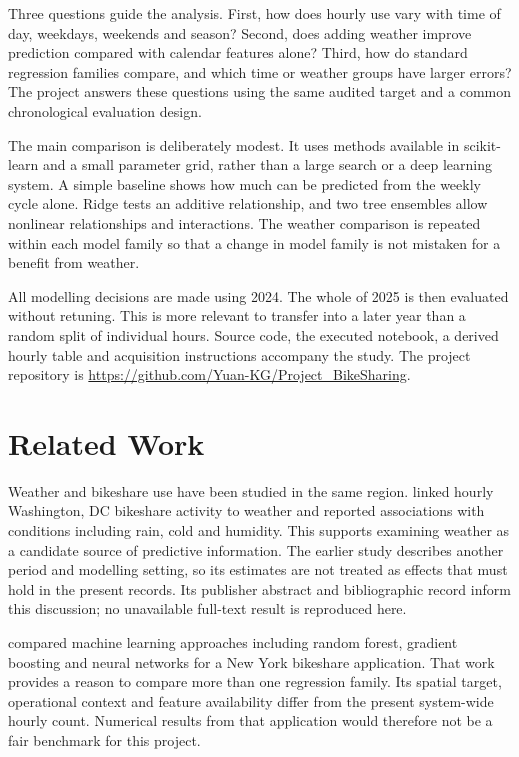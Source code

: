 \documentclass[10pt]{article}
\begin{document}
Three questions guide the analysis. First, how does hourly use vary with time of day, weekdays, weekends and season? Second, does adding weather improve prediction compared with calendar features alone? Third, how do standard regression families compare, and which time or weather groups have larger errors? The project answers these questions using the same audited target and a common chronological evaluation design.

The main comparison is deliberately modest. It uses methods available in scikit-learn and a small parameter grid, rather than a large search or a deep learning system. A simple baseline shows how much can be predicted from the weekly cycle alone. Ridge tests an additive relationship, and two tree ensembles allow nonlinear relationships and interactions. The weather comparison is repeated within each model family so that a change in model family is not mistaken for a benefit from weather.

All modelling decisions are made using 2024. The whole of 2025 is then evaluated without retuning. This is more relevant to transfer into a later year than a random split of individual hours. Source code, the executed notebook, a derived hourly table and acquisition instructions accompany the study. The project repository is \url{https://github.com/Yuan-KG/Project_BikeSharing}.

\section{Related Work}
Weather and bikeshare use have been studied in the same region. \citet{gebhart2014weather} linked hourly Washington, DC bikeshare activity to weather and reported associations with conditions including rain, cold and humidity. This supports examining weather as a candidate source of predictive information. The earlier study describes another period and modelling setting, so its estimates are not treated as effects that must hold in the present records. Its publisher abstract and bibliographic record inform this discussion; no unavailable full-text result is reproduced here.

\citet{torres2024forecasting} compared machine learning approaches including random forest, gradient boosting and neural networks for a New York bikeshare application. That work provides a reason to compare more than one regression family. Its spatial target, operational context and feature availability differ from the present system-wide hourly count. Numerical results from that application would therefore not be a fair benchmark for this project.
\end{document}
